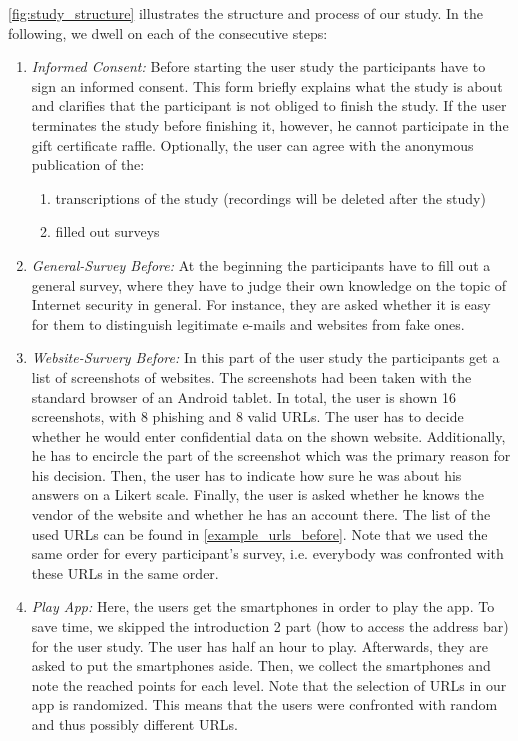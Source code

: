 \autoref{fig:study_structure} illustrates the structure and process of our study. In the following, we dwell on each of the consecutive steps:
\begin{enumerate}
	\item \textit{Informed Consent:} Before starting the user study the participants have to sign an informed consent.
This form briefly explains what the study is about and clarifies that the participant is not obliged to finish the study.
If the user terminates the study before finishing it, however, he cannot participate in the gift certificate raffle.
Optionally, the user can agree with the anonymous publication of the:
	\begin{enumerate}
		\item transcriptions of the study (recordings will be deleted after the study)
		\item filled out surveys
	\end{enumerate}

	\item \textit{General-Survey Before:} At the beginning the participants have to fill out a general survey, where they have to judge their own knowledge on the topic of Internet security in general.
 For instance, they are asked whether it is easy for them to distinguish legitimate e-mails and websites from fake ones.

	\item \textit{Website-Survery Before:} In this part of the user study the participants get a list of screenshots of websites.
 The screenshots had been taken with the standard browser of an Android tablet.
 In total, the user is shown 16 screenshots, with 8 phishing and 8 valid URLs.
 The user has to decide whether he would enter confidential data on the shown website.
 Additionally, he has to encircle the part of the screenshot which was the primary reason for his decision.
 Then, the user has to indicate how sure he was about his answers on a Likert scale.
 Finally, the user is asked whether he knows the vendor of the website and whether he has an account there.
 The list of the used URLs can be found in \autoref{example_urls_before}.
Note that we used the same order for every participant's survey, i.e. everybody was confronted with these URLs in the same order.

	\item \textit{Play App:} Here, the users get the smartphones in order to play the app.
 To save time, we skipped the introduction 2 part (how to access the address bar) for the user study.
 The user has half an hour to play.
 Afterwards, they are asked to put the smartphones aside.
 Then, we collect the smartphones and note the reached points for each level.
Note that the selection of URLs in our app is randomized.
This means that the users were confronted with random and thus possibly different URLs.


\end{enumerate}
